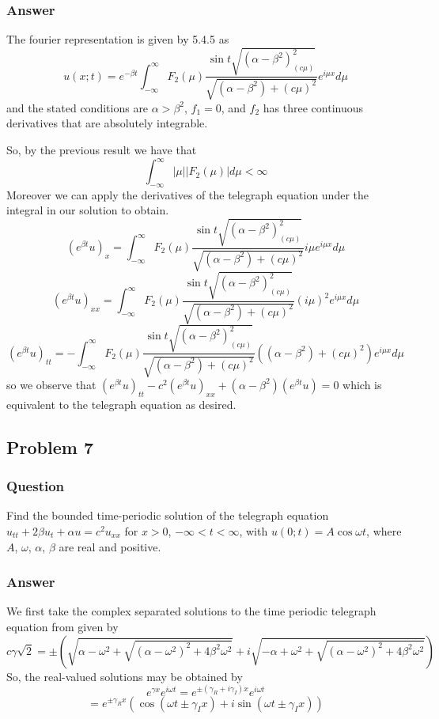 \documentclass[12pt]{article}
\begin{document}
\subsubsection{Answer}

The fourier representation is given by 5.4.5  as
\[u(x;t)=e^{-\beta t} \int_{-\infty}^\infty F_2(\mu) \frac{\sin{t\sqrt{(\alpha-\beta^2)_(c\mu)^2}}}{\sqrt{(\alpha-\beta^2)+(c\mu)^2}} e^{i \mu x} d\mu\]
and the stated conditions are $\alpha>\beta^2$, $f_1=0$, and $f_2$ has three continuous derivatives that are absolutely integrable.

So, by the previous result we have that
\[\int_{-\infty}^\infty |\mu||F_2(\mu)|d\mu < \infty\]
Moreover we can apply the derivatives of the telegraph equation under the integral in our solution to obtain.
\[(e^{\beta t} u)_x= \int_{-\infty}^\infty F_2(\mu) \frac{\sin{t\sqrt{(\alpha-\beta^2)_(c\mu)^2}}}{\sqrt{(\alpha-\beta^2)+(c\mu)^2}} i \mu e^{i \mu x} d\mu\]
\[(e^{\beta t} u)_{xx}= \int_{-\infty}^\infty F_2(\mu) \frac{\sin{t\sqrt{(\alpha-\beta^2)_(c\mu)^2}}}{\sqrt{(\alpha-\beta^2)+(c\mu)^2}} (i \mu)^2 e^{i \mu x} d\mu\]
\[(e^{\beta t} u)_{tt}= - \int_{-\infty}^\infty F_2(\mu) \frac{\sin{t\sqrt{(\alpha-\beta^2)_(c\mu)^2}}}{\sqrt{(\alpha-\beta^2)+(c\mu)^2}} \left( (\alpha-\beta^2) + (c \mu)^2 \right) e^{i \mu x} d\mu\]
so we observe that $(e^{\beta t} u)_{tt}-c^2 ( e^{\beta t} u)_{xx}+ (\alpha-\beta^2)(e^{\beta t} u)=0$ which is equivalent to the telegraph equation as desired.


\subsection{Problem 7}
\subsubsection{Question}
Find the bounded time-periodic solution of the telegraph equation $u_{tt}+2 \beta u_t+\alpha u = c^2 u_{xx}$ for $x>0$, $-\infty<t<\infty$, with $u(0;t)=A \cos{\omega t}$, where $A$, $\omega$, $\alpha$, $\beta$ are real and positive.

\subsubsection{Answer}
We first take the complex separated solutions to the time periodic telegraph equation from \cite[Page 340]{pinsky} given by
\[c \gamma \sqrt{2} = \pm \left( \sqrt{\alpha-\omega^2 + \sqrt{(\alpha-\omega^2)^2 +4\beta^2\omega^2}} + i \sqrt{- \alpha+ \omega^2 + \sqrt{(\alpha-\omega^2)^2 +4\beta^2\omega^2}} \right) \]
So, the real-valued solutions may be obtained by 
\[e^{\gamma x} e^{i \omega t}=e^{ \pm (\gamma_R + i \gamma_I) x} e^{i\omega t}\]
\[=e^{ \pm \gamma_R  x} \left( \cos{(\omega t \pm \gamma_I x)} + i \sin{( \omega t \pm \gamma_I x)} \right) \]
\end{document}
